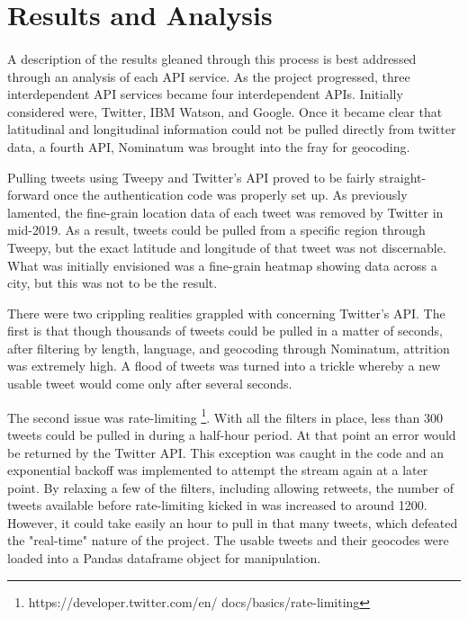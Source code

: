 \documentclass[12pt, oneside]{article}
\begin{document}
\section{Results and Analysis}
\paragraph{}
A description of the results gleaned through this process is best addressed
through an analysis of each API service. As the project progressed, three
interdependent API services became four interdependent APIs. Initially
considered were, Twitter, IBM Watson, and Google. Once it became clear that
latitudinal and longitudinal information could not be pulled directly from
twitter data, a fourth API, Nominatum was brought into the fray for geocoding.

Pulling tweets using Tweepy and Twitter's API proved to be fairly straight-
forward once the authentication code was properly set up. As previously
lamented, the fine-grain location data of each tweet was removed
by Twitter in mid-2019. As a result, tweets could be pulled from a specific
region through Tweepy, but the exact latitude and longitude of that
tweet was not discernable. What was initially envisioned was a fine-grain
heatmap showing data across a city, but this was not to be the result.

There were two crippling realities grappled with concerning Twitter's API. The
first is that though thousands of tweets could be pulled in a matter of
seconds, after filtering by length, language, and geocoding through Nominatum,
attrition was extremely high. A flood of tweets was turned into a trickle
whereby a new usable tweet would come only after several seconds.

The second issue was rate-limiting \footnote{https://developer.twitter.com/en/
docs/basics/rate-limiting}. With all the filters in place, less than 300 tweets
could be pulled in during a half-hour period. At that point an error would be
returned by the Twitter API. This exception was caught in the code and an
exponential backoff was implemented to attempt the stream again at a later
point. By relaxing a few of the filters, including allowing retweets, the
number of tweets available before rate-limiting kicked in was increased to
around 1200. However, it could take easily an hour to pull in that many tweets,
which defeated the "real-time" nature of the project. The usable tweets and
their geocodes were loaded into a
Pandas dataframe object for manipulation.
\end{document}
